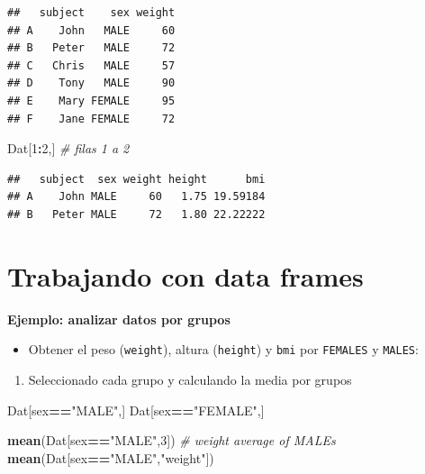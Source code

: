\documentclass[]{book}
\newenvironment{Shaded}{\begin{snugshade}}{\end{snugshade}}
\newcommand{\KeywordTok}[1]{\textcolor[rgb]{0.13,0.29,0.53}{\textbf{#1}}}
\newcommand{\DecValTok}[1]{\textcolor[rgb]{0.00,0.00,0.81}{#1}}
\newcommand{\StringTok}[1]{\textcolor[rgb]{0.31,0.60,0.02}{#1}}
\newcommand{\CommentTok}[1]{\textcolor[rgb]{0.56,0.35,0.01}{\textit{#1}}}
\newcommand{\OperatorTok}[1]{\textcolor[rgb]{0.81,0.36,0.00}{\textbf{#1}}}
\newcommand{\NormalTok}[1]{#1}
\providecommand{\tightlist}{%
  \setlength{\itemsep}{0pt}\setlength{\parskip}{0pt}}
\begin{document}
\begin{verbatim}
##   subject    sex weight
## A    John   MALE     60
## B   Peter   MALE     72
## C   Chris   MALE     57
## D    Tony   MALE     90
## E    Mary FEMALE     95
## F    Jane FEMALE     72
\end{verbatim}

\begin{Shaded}
\begin{Highlighting}[]
\NormalTok{Dat[}\DecValTok{1}\OperatorTok{:}\DecValTok{2}\NormalTok{,]   }\CommentTok{# filas 1 a 2}
\end{Highlighting}
\end{Shaded}

\begin{verbatim}
##   subject  sex weight height      bmi
## A    John MALE     60   1.75 19.59184
## B   Peter MALE     72   1.80 22.22222
\end{verbatim}

\section{Trabajando con data frames}\label{trabajando-con-data-frames}

\textbf{Ejemplo: analizar datos por grupos}

\begin{itemize}
\tightlist
\item
  Obtener el peso (\texttt{weight}), altura (\texttt{height}) y
  \texttt{bmi} por \texttt{FEMALES} y \texttt{MALES}:
\end{itemize}

\begin{enumerate}
\def\labelenumi{\arabic{enumi}.}
\tightlist
\item
  Seleccionado cada grupo y calculando la media por grupos
\end{enumerate}

\begin{Shaded}
\begin{Highlighting}[]
\NormalTok{Dat[sex}\OperatorTok{==}\StringTok{"MALE"}\NormalTok{,]}
\NormalTok{Dat[sex}\OperatorTok{==}\StringTok{"FEMALE"}\NormalTok{,]}

\KeywordTok{mean}\NormalTok{(Dat[sex}\OperatorTok{==}\StringTok{"MALE"}\NormalTok{,}\DecValTok{3}\NormalTok{])  }\CommentTok{# weight average of MALEs}
\KeywordTok{mean}\NormalTok{(Dat[sex}\OperatorTok{==}\StringTok{"MALE"}\NormalTok{,}\StringTok{"weight"}\NormalTok{])}
\end{Highlighting}
\end{Shaded}
\end{document}
